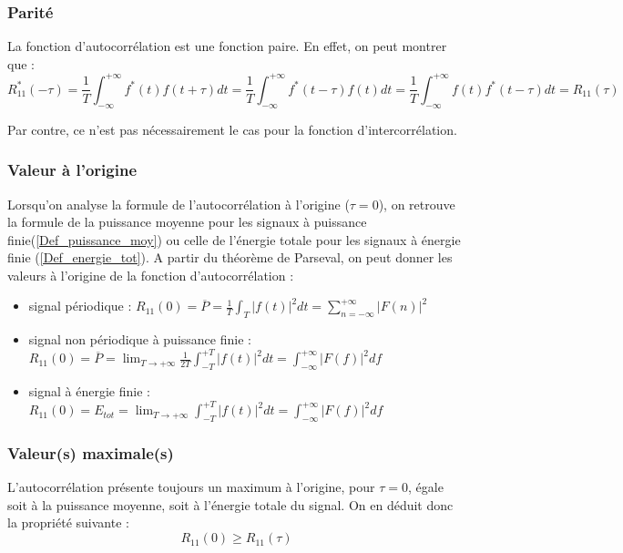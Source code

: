 	\subsubsection{Parité}
	La fonction d'autocorrélation est une fonction paire. En effet, on peut montrer que :
	\begin{equation}\label{key}
	R^{*}_{11}(-\tau)=\frac{1}{T}\int_{-\infty}^{+\infty}f^{*}(t)f(t+\tau)dt=\frac{1}{T}\int_{-\infty}^{+\infty}f^{*}(t-\tau)f(t)dt=\frac{1}{T}\int_{-\infty}^{+\infty}f(t)f^{*}(t-\tau)dt=R_{11}(\tau)
	\end{equation}
	
	Par contre, ce n'est pas nécessairement le cas pour la fonction d'intercorrélation.
	
	\subsubsection{Valeur à l'origine}
	Lorsqu'on analyse la formule de l'autocorrélation à l'origine ($\tau=0$), on retrouve la formule de la puissance moyenne pour les signaux à puissance finie(\ref{Def_puissance_moy}) ou celle de l'énergie totale pour les signaux à énergie finie (\ref{Def_energie_tot}). A partir du théorème de Parseval, on peut donner les valeurs à l'origine de la fonction d'autocorrélation :
	
	\begin{itemize}
		\item signal périodique : $R_{11}(0)=\overline{P}=\frac{1}{T}\int_{T}|f(t)|^{2}dt=\sum_{n=-\infty}^{+\infty}|F(n)|^{2}$
		\item  signal non périodique à puissance finie : $R_{11}(0)=\overline{P}=\lim_{T \to +\infty}\frac{1}{2T}\int_{-T}^{+T}|f(t)|^{2}dt=\int_{-\infty}^{+\infty}|F(f)|^{2}df$
		\item signal à énergie finie : $R_{11}(0)= E_{tot}=\lim_{T \to +\infty}\int_{-T}^{+T}|f(t)|^{2}dt=\int_{-\infty}^{+\infty}|F(f)|^{2}df$		
	\end{itemize}


	\subsubsection{Valeur(s) maximale(s)}
	
	L'autocorrélation présente toujours un maximum à l'origine, pour $\tau = 0$, égale soit à la puissance moyenne, soit à l'énergie totale du signal.  On en déduit donc la propriété suivante :
	\begin{equation}\label{key}
	R_{11}(0) \geq R_{11}(\tau)
	\end{equation}
	
